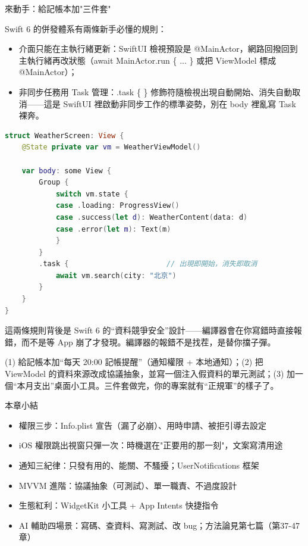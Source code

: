 \begin{tcbpractice}{來動手：給記帳本加"三件套"}

Swift 6 的併發體系有兩條新手必懂的規則：

\begin{itemize}
  \item 介面只能在主執行緒更新：SwiftUI 檢視預設是 @MainActor，網路回撥回到主執行緒再改狀態（await MainActor.run \{ ... \} 或把 ViewModel 標成 @MainActor）；
  \item 非同步任務用 Task 管理：.task \{ \} 修飾符隨檢視出現自動開始、消失自動取消——這是 SwiftUI 裡啟動非同步工作的標準姿勢，別在 body 裡亂寫 Task 裸奔。
\end{itemize}

\begin{lstlisting}[language=Swift]
struct WeatherScreen: View {
    @State private var vm = WeatherViewModel()

    var body: some View {
        Group {
            switch vm.state {
            case .loading: ProgressView()
            case .success(let d): WeatherContent(data: d)
            case .error(let m): Text(m)
            }
        }
        .task {                       // 出現即開始，消失即取消
            await vm.search(city: "北京")
        }
    }
}
\end{lstlisting}

這兩條規則背後是 Swift 6 的“資料競爭安全”設計——編譯器會在你寫錯時直接報錯，而不是等 App 崩了才發現。編譯器的報錯不是找茬，是替你擋子彈。

(1) 給記帳本加“每天 20:00 記帳提醒”（通知權限 + 本地通知）；(2) 把 ViewModel 的資料來源改成協議抽象，並寫一個注入假資料的單元測試；(3) 加一個“本月支出”桌面小工具。三件套做完，你的專案就有“正規軍”的樣子了。

\end{tcbpractice}

\begin{tcbsummary}{本章小結}
\begin{itemize}
  \item 權限三步：Info.plist 宣告（漏了必崩）、用時申請、被拒引導去設定
  \item iOS 權限跳出視窗只彈一次：時機選在"正要用的那一刻"，文案寫清用途
  \item 通知三紀律：只發有用的、能關、不騷擾；UserNotifications 框架
  \item MVVM 進階：協議抽象（可測試）、單一職責、不過度設計
  \item 生態紅利：WidgetKit 小工具 + App Intents 快捷指令
  \item AI 輔助四場景：寫碼、查資料、寫測試、改 bug；方法論見第七篇（第37-47章）
\end{itemize}

\end{tcbsummary}
